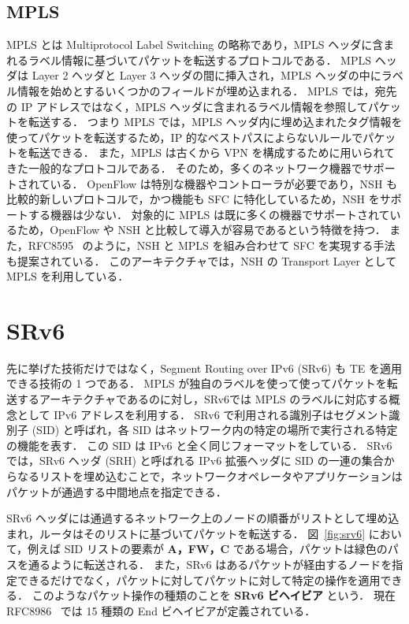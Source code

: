 \subsection*{MPLS}
\label{sbsection:mpls}
MPLS とは Multiprotocol Label Switching の略称であり，MPLS ヘッダに含まれるラベル情報に基づいてパケットを転送するプロトコルである．
MPLS ヘッダは Layer 2 ヘッダと Layer 3 ヘッダの間に挿入され，MPLS ヘッダの中にラベル情報を始めとするいくつかのフィールドが埋め込まれる．
MPLS では，宛先の IP アドレスではなく，MPLS ヘッダに含まれるラベル情報を参照してパケットを転送する．
つまり MPLS では，MPLS ヘッダ内に埋め込まれたタグ情報を使ってパケットを転送するため，IP 的なベストパスによらないルールでパケットを転送できる．
また，MPLS は古くから VPN を構成するために用いられてきた一般的なプロトコルである．
そのため，多くのネットワーク機器でサポートされている．
OpenFlow は特別な機器やコントローラが必要であり，NSH も比較的新しいプロトコルで，かつ機能も SFC に特化しているため，NSH をサポートする機器は少ない．
対象的に MPLS は既に多くの機器でサポートされているため，OpenFlow や NSH と比較して導入が容易であるという特徴を持つ．
また，RFC8595~\cite{rfc8595} のように，NSH と MPLS を組み合わせて SFC を実現する手法も提案されている．
このアーキテクチャでは，NSH の Transport Layer として MPLS を利用している．

\section{SRv6}
\label{section:srv6}
先に挙げた技術だけではなく，Segment Routing over IPv6 (SRv6) も TE を適用できる技術の 1 つである．
MPLS が独自のラベルを使って使ってパケットを転送するアーキテクチャであるのに対し，SRv6では MPLS のラベルに対応する概念として IPv6 アドレスを利用する．
SRv6 で利用される識別子はセグメント識別子 (SID) と呼ばれ，各 SID はネットワーク内の特定の場所で実行される特定の機能を表す．
この SID は IPv6 と全く同じフォーマットをしている．
SRv6 では，SRv6 ヘッダ (SRH) と呼ばれる IPv6 拡張ヘッダに SID の一連の集合からなるリストを埋め込むことで，ネットワークオペレータやアプリケーションはパケットが通過する中間地点を指定できる．

SRv6 ヘッダには通過するネットワーク上のノードの順番がリストとして埋め込まれ，ルータはそのリストに基づいてパケットを転送する．
図~\ref*{fig:srv6} において，例えば SID リストの要素が \textbf{A，FW，C} である場合，パケットは緑色のパスを通るように転送される．
また，SRv6 はあるパケットが経由するノードを指定できるだけでなく，パケットに対してパケットに対して特定の操作を適用できる．
このようなパケット操作の種類のことを \textbf{SRv6 ビヘイビア} という．
現在 RFC8986~\cite{rfc8986} では 15 種類の End ビヘイビアが定義されている．

